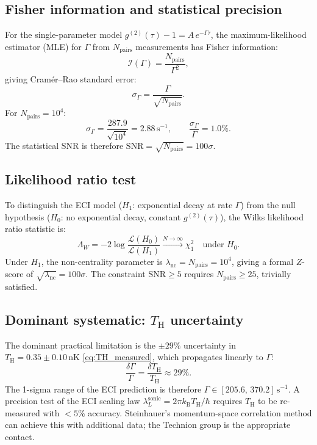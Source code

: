 \documentclass[12pt,a4paper]{article}
\renewcommand{\TH}{T_{\mathrm{H}}}
\newcommand{\lambdaL}{\lambda_L^{\mathrm{sonic}}}
\newcommand{\kB}{k_{\mathrm{B}}}
\begin{document}
\subsection{Fisher information and statistical precision}

For the single-parameter model $g^{(2)}(\tau) - 1 = A\,e^{-\Gamma\tau}$,
the maximum-likelihood estimator (MLE) for $\Gamma$ from $N_{\mathrm{pairs}}$
measurements has Fisher information:
\begin{equation}
  \mathcal{I}(\Gamma) = \frac{N_{\mathrm{pairs}}}{\Gamma^2},
\end{equation}
giving Cram\'er--Rao standard error:
\begin{equation}
  \sigma_\Gamma = \frac{\Gamma}{\sqrt{N_{\mathrm{pairs}}}}.
\end{equation}
For $N_{\mathrm{pairs}} = 10^4$:
\begin{equation}
  \sigma_\Gamma = \frac{287.9}{\sqrt{10^4}} = 2.88\,\mathrm{s}^{-1},
  \qquad
  \frac{\sigma_\Gamma}{\Gamma} = 1.0\%.
\end{equation}
The statistical SNR is therefore $\mathrm{SNR} = \sqrt{N_{\mathrm{pairs}}} = 100\sigma$.

\subsection{Likelihood ratio test}

To distinguish the ECI model ($H_1$: exponential decay at rate $\Gamma$)
from the null hypothesis ($H_0$: no exponential decay, constant
$g^{(2)}(\tau)$), the Wilks likelihood ratio statistic is:
\begin{equation}
  \Lambda_W = -2\log\frac{\mathcal{L}(H_0)}{\mathcal{L}(H_1)}
    \xrightarrow{N\to\infty} \chi^2_1
    \quad\text{under }H_0.
\end{equation}
Under $H_1$, the non-centrality parameter is
$\lambda_{\mathrm{nc}} = N_{\mathrm{pairs}} = 10^4$, giving a formal
$Z$-score of $\sqrt{\lambda_{\mathrm{nc}}} = 100\sigma$.
The constraint $\mathrm{SNR} \geq 5$ requires $N_{\mathrm{pairs}} \geq 25$,
trivially satisfied.

\subsection{Dominant systematic: $\TH$ uncertainty}

The dominant practical limitation is the $\pm 29\%$ uncertainty in
$\TH = 0.35 \pm 0.10\,\mathrm{nK}$ \eqref{eq:TH_measured}, which
propagates linearly to $\Gamma$:
\begin{equation}
  \frac{\delta\Gamma}{\Gamma} = \frac{\delta\TH}{\TH} \approx 29\%.
\end{equation}
The 1-sigma range of the ECI prediction is therefore
$\Gamma \in [205.6,\,370.2]\,\mathrm{s}^{-1}$.
A precision test of the ECI scaling law $\lambdaL = 2\pi\kB\TH/\hbar$
requires $\TH$ to be re-measured with $<5\%$ accuracy.
Steinhauer's momentum-space correlation method can achieve this with
additional data; the Technion group is the appropriate contact.
\end{document}
